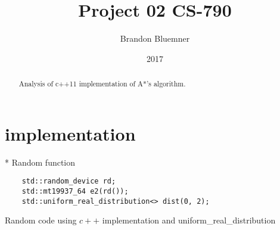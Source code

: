 \documentclass[12pt]{article}
\begin{document}
\title{Project 02 CS-790}
\author{Brandon Bluemner}
\date{2017}
\maketitle
\begin{abstract}
Analysis of c++11 implementation of A*'s algorithm. 
\end{abstract}
\section{implementation}*
Random function 
\begin{lstlisting}
	std::random_device rd;
	std::mt19937_64 e2(rd());
	std::uniform_real_distribution<> dist(0, 2);
\end{lstlisting}
Random code using $c++$ implementation and uniform\_real\_distribution
\cite{random}
\end{document}
